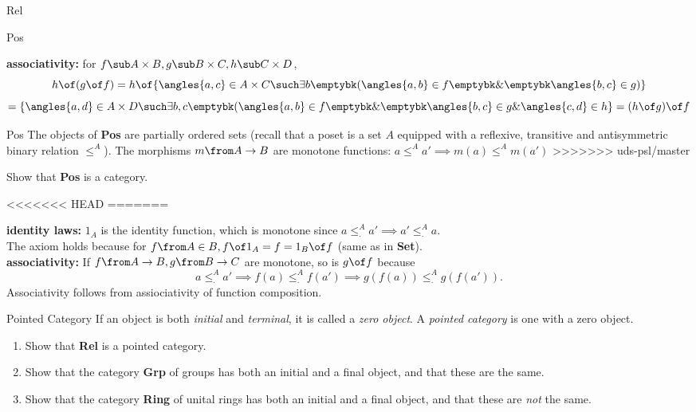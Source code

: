 \begin {definition}{Rel}
\begin{definition}{Pos}
\begin{answer}
\textbf{associativity:} for $f \sub A \times B, g\sub B \times C, h \sub C \times D$,
\[
h \of (g \of f) = h \of \{ \angles{a, c} \in A \times C \such \exists b \emptybk (\angles {a, b} \in f \emptybk \& \emptybk \angles{b, c} \in g)\}
\]
\[= \{ \angles{a, d} \in A \times D \such \exists b, c \emptybk (\angles {a, b} \in f \emptybk \& \emptybk \angles{b, c} \in g \& \angles{c, d} \in h \} = (h \of g) \of f\]

\end{answer}


\begin{definition}{Pos} The objects of  \textbf{Pos} are partially ordered sets
(recall that a poset is a set $A$ equipped with a reflexive, transitive and antisymmetric binary relation $\leq^A$). The morphisms $m \from A \to B $ are monotone functions: $a \leq^A a' \implies m(a) \leq^A m(a')$
>>>>>>> uds-psl/master
\end{definition}

\begin {exercise}
Show that \textbf{Pos} is a category.
\end{exercise}
<<<<<<< HEAD
=======

\begin{answer}
  \textbf{identity laws:} $1_A$ is the identity function, which is monotone since $a \leq^A_\cdot a' \implies a' \leq^A_\cdot a.$
\\The axiom holds because for $f \from A \in B, f \of 1_A = f = 1_B \of f$ (same as in \textbf{Set}).
\\
\textbf{associativity:} If $ f \from A \to B, g \from B \to C $ are monotone, so is $g \of f$ because \[a \leq^A_\cdot a' \implies f(a) \leq^A_\cdot f(a') \implies  g(f(a)) \leq^A_\cdot g(f(a'))  .\] Associativity follows from assiociativity of function composition.
\end{answer}


\begin{definition}{Pointed Category} If an object is both \emph{initial} and \emph{terminal}, it is called a \emph{zero object}. A \emph{pointed category} is one with a zero object.
\end{definition}

\begin{exercise}
  \begin{enumerate}
  \item Show that \textbf{Rel} is a pointed category.
  \item Show that the category \textbf{Grp} of groups has both an initial and a final object, and that these are the same.
  \item Show that the category \textbf{Ring} of unital rings has both an initial and a final object, and that these are \emph{not} the same.
  \end{enumerate}
\end{exercise}


\end{definition}
\end{definition}
